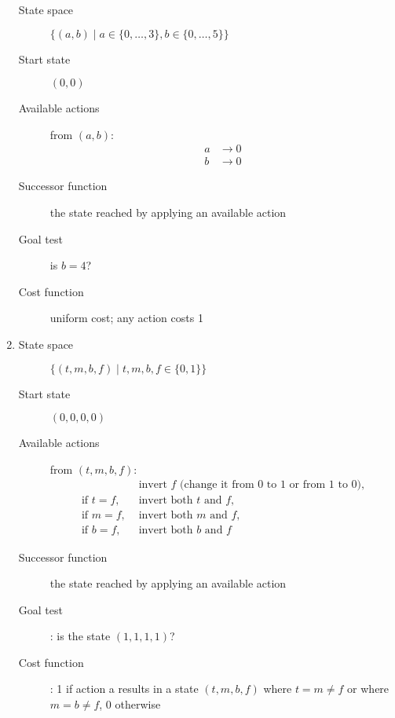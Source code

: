 \documentclass[11pt]{amsart}
\begin{document}
\begin{enumerate}
\begin{description}
\item[State space] $\{(a,b) \mid a \in \{0, \dots, 3\}, b \in \{0, \dots, 5\} \}$

\item[Start state] $(0, 0)$

\item[Available actions] from $(a, b)$:
\begin{align*}
	a &\rightarrow 0 \\
	b &\rightarrow 0
\end{align*}

\item[Successor function] the state reached by applying an available action

\item[Goal test] is $b = 4$?

\item[Cost function] uniform cost; any action costs 1

\end{description}

\item

\begin{description}


\item[State space] $\{(t, m, b, f) \mid t, m, b, f \in \{0, 1\}\}$

\item[Start state] $(0, 0, 0, 0)$

\item[Available actions] from $(t, m, b, f)$:
\begin{align*}
	&\text{ invert $f$ (change it from 0 to 1 or from 1 to 0),} \\
	\text{if } t = f, &\text{ invert both $t$ and $f$,} \\
	\text{if } m = f, &\text{ invert both $m$ and $f$,} \\
	\text{if } b = f, &\text{ invert both $b$ and $f$}
\end{align*}

\item[Successor function] the state reached by applying an available action

\item[Goal test]: is the state $(1, 1, 1, 1)$?

\item[Cost function]: 1 if action a results in a state $(t, m, b, f)$ where $t
= m \neq f$ or where $m = b \neq f$, 0 otherwise

\end{description}

\end{enumerate}
\end{document}
